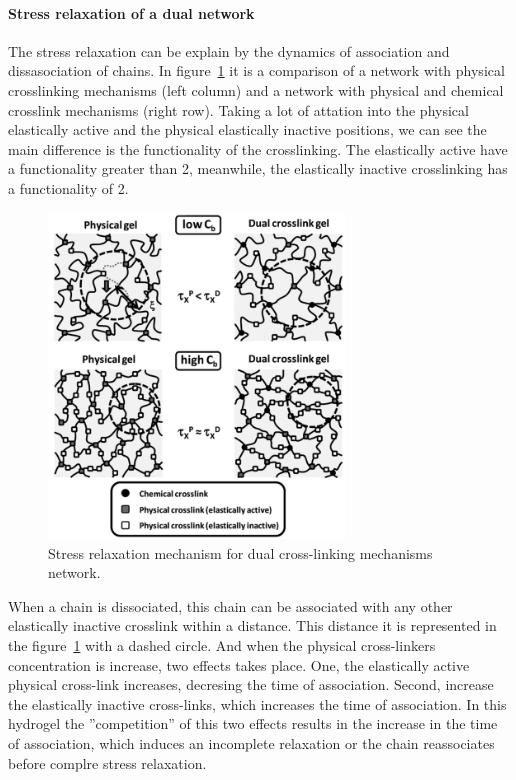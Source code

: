 \paragraph{Stress relaxation of a dual network}
The stress relaxation can be explain by the dynamics of association and dissasociation of chains\citep{naritaViscoelasticPropertiesPolyvinyl2013}.
In figure~\ref{fig:hydroMechResponse1} it is a comparison of a network with physical crosslinking mechanisms (left column) and a network with physical and chemical crosslink mechanisms (right row).
Taking a lot of attation into the physical elastically active and the physical elastically inactive positions, we can see the main difference is the functionality of the crosslinking.
The elastically active have a functionality greater than 2, meanwhile, the elastically inactive crosslinking has a functionality of 2. 

\begin{figure}[ht!]
    \centering
    \includegraphics[width=0.7\textwidth]{figs/explainMechResponse/dualNetwork1.png}
    \caption{Stress relaxation mechanism for dual cross-linking mechanisms network\citep{naritaViscoelasticPropertiesPolyvinyl2013}.}\label{fig:hydroMechResponse1}
\end{figure}

When a chain is dissociated, this chain can be associated with any other elastically inactive crosslink within a distance.
This distance it is represented in the figure~\ref{fig:hydroMechResponse1} with a dashed circle.
And when the physical cross-linkers concentration is increase, two effects takes place.
One, the elastically active physical cross-link increases, decresing the time of association.
Second, increase the elastically inactive cross-links, which increases the time of association.
In this hydrogel the ''competition'' of this two effects results in the increase in the time of association, which induces an incomplete relaxation or the chain reassociates before complre stress relaxation.

